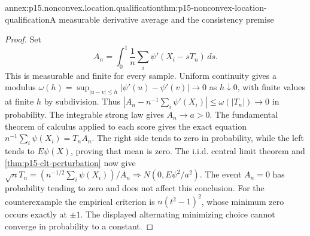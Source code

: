 \begin{annexitem}{annex:p15.nonconvex.location.qualification}{thm:p15-nonconvex-location-qualification}{A measurable derivative average and the consistency premise}
\begin{proof}
Set
\[
 A_n=\int_0^1\frac1n\sum_i\psi'(X_i-sT_n)\,ds .
\]
This is measurable and finite for every sample.
Uniform continuity gives a modulus
\(\omega(h)=\sup_{|u-v|\leq h}|\psi'(u)-\psi'(v)|\to0\)
as \(h\downarrow0\), with finite values at finite \(h\) by subdivision.
Thus
\(\left|A_n-n^{-1}\sum_i\psi'(X_i)\right|\leq\omega(|T_n|)\to0\)
in probability. The integrable strong law gives \(A_n\to a>0\).
The fundamental theorem of calculus applied to each score gives
the exact equation \(n^{-1}\sum_i\psi(X_i)=T_nA_n\).
The right side tends to zero in probability, while the left tends
to \(E\psi(X)\), proving that mean is zero.
The i.i.d. central limit theorem and
\cref{thm:p15-clt-perturbation} now give
\(\sqrt nT_n=(n^{-1/2}\sum_i\psi(X_i))/A_n
 \Rightarrow N(0,E\psi^2/a^2)\).
The event \(A_n=0\) has probability tending to zero and does not
affect this conclusion.
For the counterexample the empirical criterion is
\(n(t^2-1)^2\), whose minimum zero occurs exactly at \(\pm1\).
The displayed alternating minimizing choice cannot converge in
probability to a constant.
\end{proof}
\end{annexitem}

